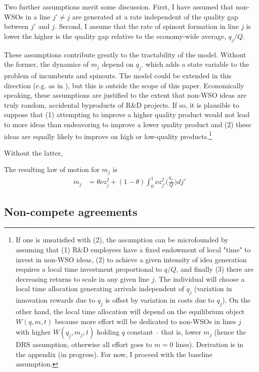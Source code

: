 \documentclass[11pt,english]{article}
\theoremstyle{remark}
\begin{document}
Two further assumptions merit some discussion. First, I have assumed that non-WSOs in a line $j' \ne j$ are generated at a rate independent of the quality gap between $j'$ and $j$. Second, I assume that the rate of spinout formation in line $j$ is lower the higher is the quality gap relative to the economy-wide average, $q_j/Q$. 

These assumptions contribute greatly to the tractability of the model. Without the former, the dynamics of $m_j$ depend on $q_j$. which adds a state variable to the problem of incumbents and spinouts. The model could be extended in this direction (e.g. as in \cite{acemoglu_innovation_2015}), but this is outside the scope of this paper. Economically speaking, these assumptions are justified to the extent that non-WSO ideas are truly random, accidental byproducts of R\&D projects. If so, it is plausible to suppose that (1) attempting to improve a higher quality product would not lead to more ideas than endeavoring to improve a lower quality product and (2) these ideas are equally likely to improve on high or low-quality products.\footnote{If one is unsatisfied with (2), the assumption can be microfounded by assuming that (1) R\&D employees have a fixed endowment of local "time" to invest in non-WSO ideas, (2) to achieve a given intensity of idea generation requires a local time investment proportional to $q/Q$, and finally (3) there are decreasing returns to scale in any given line $j$. The individual will choose a local time allocation generating arrivals independent of $q_j$ (variation in innovation rewards due to $q_j$ is offset by variation in costs due to $q_j$). On the other hand, the local time allocation will depend on the equilibrium object $W(q,m,t)$ because more effort will be dedicated to non-WSOs in lines $j$ with higher $W(q_j,m_j,t)$ holding $q$ constant -- that is, lower $m_j$ (hence the DRS assumption, otherwise all effort goes to $m = 0$ lines). Derivation is in the appendix (in progress). For now, I proceed with the baseline assumption.}

Without the latter, 

The resulting law of motion for $m_j$ is 
\begin{align}
	\dot{m}_j &= \theta \nu z^I_j + (1-\theta) \int_0^1 \nu z^I_{j'} \Big(\frac{q_{j'}}{Q} \Big)dj' \label{m_law_of_motion}
\end{align}

\subsection{Non-compete agreements}
\end{document}
